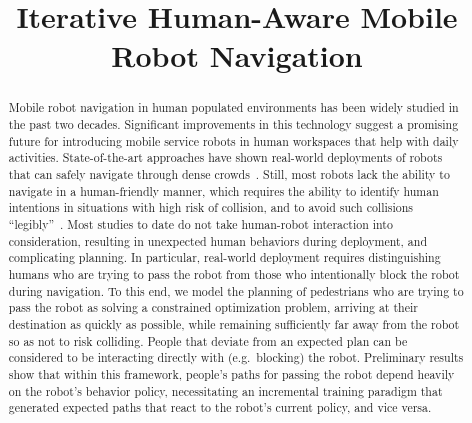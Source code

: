 \documentclass[conference]{IEEEtran}
\begin{document}
\title{Iterative Human-Aware Mobile Robot Navigation}


\author{
}


\maketitle

\begin{abstract}
Mobile robot navigation in human populated environments has been
widely studied in the past two decades. Significant improvements in
this technology suggest a promising future for introducing mobile
service robots in human workspaces that help with daily
activities. State-of-the-art approaches have shown real-world
deployments of robots that can safely navigate through dense
crowds~\cite{trautman2015robot, pfeiffer2016predicting}. Still, most
robots lack the ability to navigate in a human-friendly manner, which
requires the ability to identify human intentions in situations with
high risk of collision, and to avoid such collisions
“legibly”~\cite{dragan2013legibility}. Most studies to date do not
take human-robot interaction into consideration, resulting in
unexpected human behaviors during deployment, and complicating
planning.  In particular, real-world deployment requires
distinguishing humans who are trying to pass the robot from those who
intentionally block the robot during navigation.  To this end, we
model the planning of pedestrians who are trying to pass the robot as
solving a constrained optimization problem, arriving at their
destination as quickly as possible, while remaining sufficiently far
away from the robot so as not to risk colliding.  People that deviate
from an expected plan can be considered to be interacting directly
with (e.g.\ blocking) the robot.  Preliminary results show that within
this framework, people's paths for passing the robot depend heavily on
the robot's behavior policy, necessitating an incremental training
paradigm that generated expected paths that react to the robot's
current policy, and vice versa.
\end{abstract}

\IEEEpeerreviewmaketitle
\end{document}
